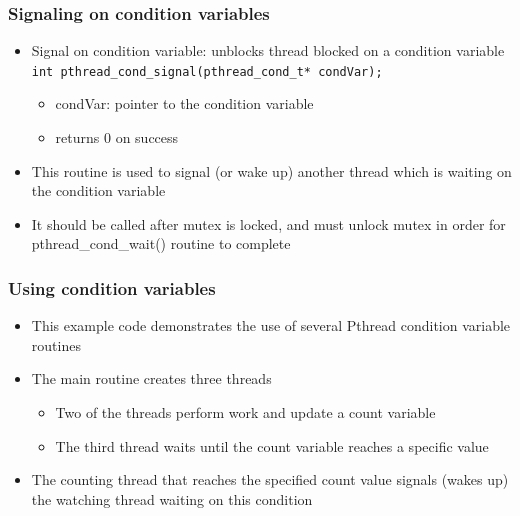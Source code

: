 \subsubsection{Signaling on condition variables}
\begin{itemize}
  \item Signal on condition variable: unblocks thread blocked on a condition variable\newline
        \lstinline{int pthread_cond_signal(pthread_cond_t* condVar);}
        \begin{itemize}
          \item condVar: pointer to the condition variable
          \item returns 0 on success
        \end{itemize}
  \item This routine is used to signal (or wake up) another thread which is waiting on the condition variable
  \item It should be called after mutex is locked, and must unlock mutex in order for pthread\_cond\_wait() routine to complete
\end{itemize}

\subsubsection{Using condition variables}
\begin{itemize}
  \item This example code demonstrates the use of several Pthread condition variable routines
  \item The main routine creates three threads
        \begin{itemize}
          \item Two of the threads perform work and update a count variable
          \item The third thread waits until the count variable reaches a specific value
        \end{itemize}
  \item The counting thread that reaches the specified count value signals (wakes up) the watching thread waiting on this condition
\end{itemize}





